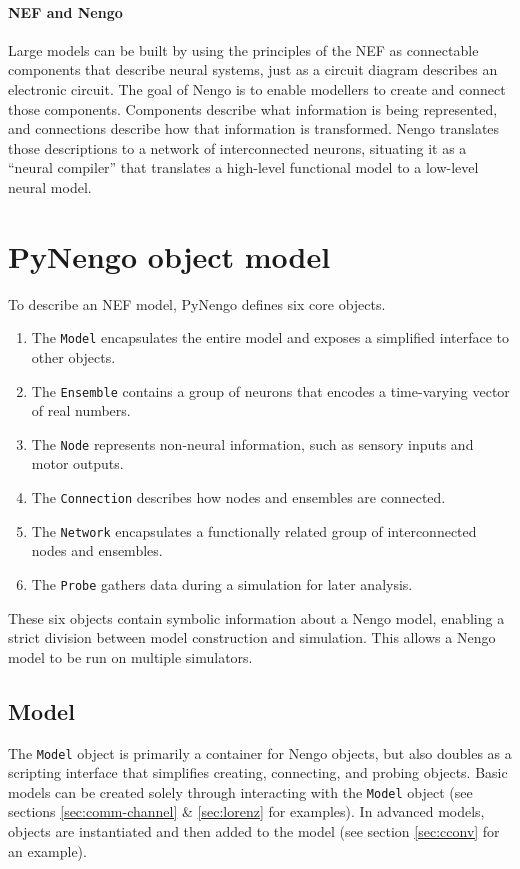 \documentclass{frontiersSCNS}
\begin{document}
\paragraph{NEF and Nengo}
Large models can be built
by using the principles of the NEF
as connectable components
that describe neural systems,
just as a circuit diagram
describes an electronic circuit.
The goal of Nengo is to enable
modellers to create and connect those components.
Components describe
what information is being represented,
and connections describe
how that information is transformed.
Nengo translates those descriptions
to a network of interconnected neurons,
situating it as a ``neural compiler''
that translates
a high-level functional model
to a low-level neural model.

\section{PyNengo object model}

To describe an NEF model,
PyNengo defines six core objects.
\begin{enumerate}
  \item The \texttt{Model} encapsulates the entire model and
    exposes a simplified interface to other objects.
  \item The \texttt{Ensemble} contains a group of neurons
    that encodes a time-varying vector of real numbers.
  \item The \texttt{Node} represents non-neural information,
    such as sensory inputs and motor outputs.
  \item The \texttt{Connection} describes how
    nodes and ensembles are connected.
  \item The \texttt{Network} encapsulates a functionally related
    group of interconnected nodes and ensembles.
  \item The \texttt{Probe} gathers data during a simulation
    for later analysis.
\end{enumerate}
These six objects contain symbolic information
about a Nengo model,
enabling a strict division between
model construction and simulation.
This allows a Nengo model
to be run on multiple simulators.

\subsection{Model}

The \texttt{Model} object is primarily a container
for Nengo objects,
but also doubles as a scripting interface
that simplifies creating, connecting,
and probing objects.
Basic models
can be created solely through interacting
with the \texttt{Model} object
(see sections \ref{sec:comm-channel} \& \ref{sec:lorenz}
for examples).
In advanced models,
objects are instantiated
and then added to the model
(see section \ref{sec:cconv} for an example).
\end{document}
